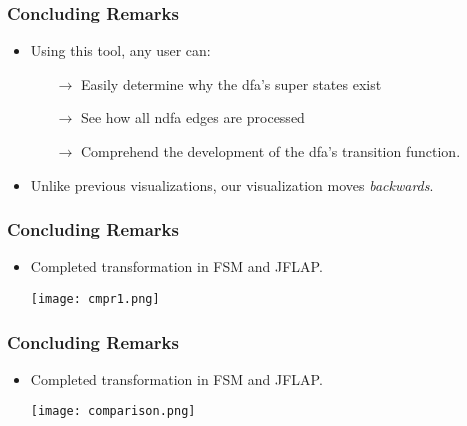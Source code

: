 \documentclass{beamer}
\newcommand{\arrow}{\(\rightarrow\)}
\begin{document}
\begin{frame}[fragile]
\frametitle{Concluding Remarks}
\begin{scriptsize}
\begin{itemize}
\normalsize
\item<1-> Using this tool, any user can: \newline
\begin{itemize}
\item[\arrow]
Easily determine why the dfa’s super states exist \newline
\item[\arrow]
See how all ndfa edges are processed \newline
\item[\arrow]
Comprehend the development of the dfa’s transition function.

\end{itemize}

\item<2-> Unlike previous visualizations, our visualization moves \emph{backwards}.

\end{itemize}
\end{scriptsize}
\end{frame}

\begin{frame}[fragile]
\frametitle{Concluding Remarks}
\begin{scriptsize}
\begin{itemize}

\item<1-> Completed transformation in FSM and JFLAP. \newline


\begin{center}
\texttt{[image: cmpr1.png]}
\end{center}


\end{itemize}
\end{scriptsize}
\end{frame}

\begin{frame}[fragile]
\frametitle{Concluding Remarks}
\begin{scriptsize}
\begin{itemize}

\item<1-> Completed transformation in FSM and JFLAP. \newline


\begin{center}
\texttt{[image: comparison.png]}
\end{center}


\end{itemize}
\end{scriptsize}
\end{frame}
\end{document}

